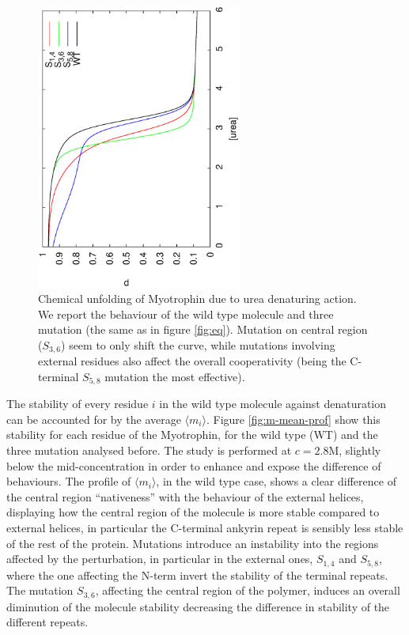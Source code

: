\begin{figure}
\centering
\includegraphics[angle=-90,width=0.6\textwidth]{./img/wsme/profchem-2.eps}
\caption{\label{fig:SI_WT+mutantsATcm}
Chemical unfolding of Myotrophin due to urea denaturing action. We report the
behaviour of the wild type molecule and three mutation (the same as in figure
\ref{fig:eq}). Mutation on central region ($S_{3,6}$) seem to only shift the
curve, while mutations involving external residues also affect the overall
cooperativity (being the C-terminal $S_{5,8}$ mutation the most effective).}
\end{figure}


The stability of every residue $i$ in the wild type molecule against
denaturation can be accounted for by the average $\langle m_i\rangle$.
Figure \ref{fig:m-mean-prof} show this stability 
for each residue of the Myotrophin, for the wild type (WT) and the
three mutation analysed before. The study is performed at $c=2.8$M, slightly
below the mid-concentration in order to enhance and expose the difference of
behaviours.
The profile of $\langle m_i \rangle$, in the wild type case, shows a clear
difference of the central region ``nativeness'' with the behaviour of the
external helices, displaying how the central region of the molecule is more
stable compared to external helices, in particular the C-terminal ankyrin repeat
is sensibly less stable of the rest of the protein.
Mutations introduce an instability into the regions affected by the
perturbation, in particular in the external ones, $S_{1,4}$ and $S_{5,8}$, where
the one affecting the N-term invert the stability of the terminal repeats. The
mutation $S_{3,6}$, affecting the central region of the polymer, induces an
overall diminution of the molecule stability decreasing the difference in
stability of the different repeats.

